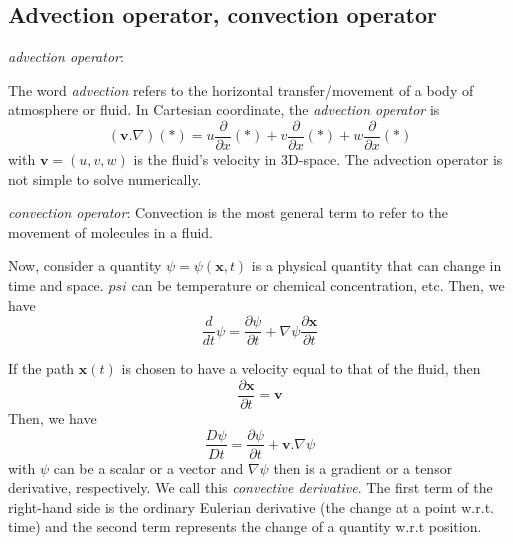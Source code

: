 \subsection{Advection operator, convection operator}
\label{sec:background}

{\it advection operator}: 

The word {\it advection} refers to the horizontal transfer/movement of
a body of atmosphere or fluid. In Cartesian coordinate, the {\it
  advection operator} is 
\begin{equation}
  \label{eq:73}
  (\mathbf{v}.\nabla)(*) = u\frac{\partial}{\partial x}(*) +
  v\frac{\partial}{\partial x}(*) + w\frac{\partial}{\partial x}(*) 
\end{equation}
with $\mathbf{v} = (u,v,w)$ is  the fluid's velocity in 3D-space.  The
advection operator is not simple to solve numerically.

{\it convection operator}: Convection is the most general term to
refer to the movement of molecules in a fluid.

Now, consider a quantity $\psi = \psi(\mathbf{x},t) $ is a physical quantity
that can change in time and space. $psi$ can be temperature or
chemical concentration, etc. Then, we have
\begin{equation}
  \label{eq:74}
  \frac{d}{dt}\psi = \frac{\partial \psi}{\partial t} + \nabla \psi
  \frac{\partial \mathbf{x}}{\partial t}
\end{equation}

If the path $\mathbf{x}(t)$ is chosen to have a velocity equal to that
of the fluid, then
\begin{equation}
  \label{eq:75}
  \frac{\partial \mathbf{x}}{\partial t} = \mathbf{v}
\end{equation}
Then, we have
\begin{equation}
  \label{eq:76}
    \frac{D\psi}{Dt} = \frac{\partial \psi}{\partial t} + \mathbf{v} .\nabla \psi  
\end{equation}
with $\psi$ can be a scalar or a vector and $\nabla \psi$ then is a
gradient or a tensor derivative, respectively. We call this
{\it convective derivative}.  The first term of the right-hand side is
the ordinary Eulerian derivative (the change at a point w.r.t. time)
and the second term represents the change of a quantity w.r.t
position.



